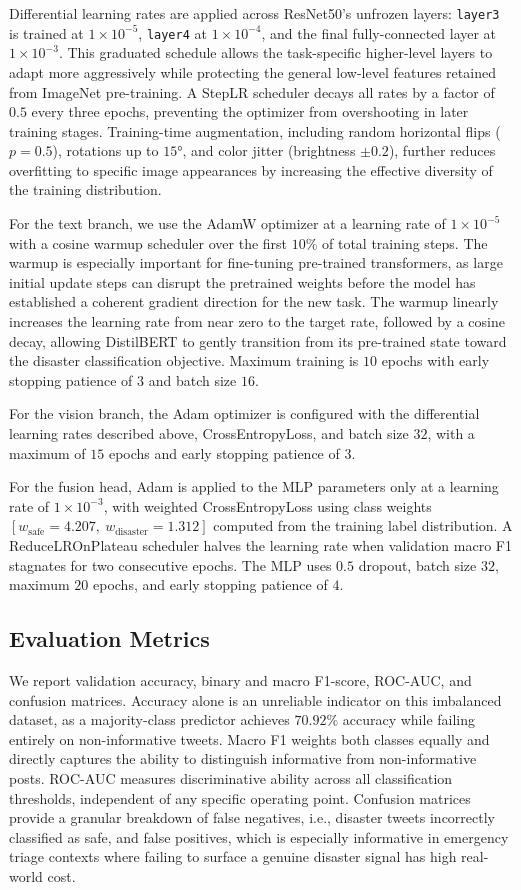 \documentclass[11pt,letterpaper]{article}
\begin{document}
Differential learning rates are applied across ResNet50's unfrozen layers: \texttt{layer3} is trained at $1\times10^{-5}$, \texttt{layer4} at $1\times10^{-4}$, and the final fully-connected layer at $1\times10^{-3}$. This graduated schedule allows the task-specific higher-level layers to adapt more aggressively while protecting the general low-level features retained from ImageNet pre-training. A StepLR scheduler decays all rates by a factor of $0.5$ every three epochs, preventing the optimizer from overshooting in later training stages. Training-time augmentation, including random horizontal flips ($p=0.5$), rotations up to $15°$, and color jitter (brightness $\pm0.2$), further reduces overfitting to specific image appearances by increasing the effective diversity of the training distribution.

For the text branch, we use the AdamW optimizer at a learning rate of $1\times10^{-5}$ with a cosine warmup scheduler over the first $10\%$ of total training steps. The warmup is especially important for fine-tuning pre-trained transformers, as large initial update steps can disrupt the pretrained weights before the model has established a coherent gradient direction for the new task. The warmup linearly increases the learning rate from near zero to the target rate, followed by a cosine decay, allowing DistilBERT to gently transition from its pre-trained state toward the disaster classification objective. Maximum training is $10$ epochs with early stopping patience of $3$ and batch size $16$.

For the vision branch, the Adam optimizer is configured with the differential learning rates described above, CrossEntropyLoss, and batch size $32$, with a maximum of $15$ epochs and early stopping patience of $3$.

For the fusion head, Adam is applied to the MLP parameters only at a learning rate of $1\times10^{-3}$, with weighted CrossEntropyLoss using class weights $[w_\text{safe}=4.207,\ w_\text{disaster}=1.312]$ computed from the training label distribution. A ReduceLROnPlateau scheduler halves the learning rate when validation macro F1 stagnates for two consecutive epochs. The MLP uses $0.5$ dropout, batch size $32$, maximum $20$ epochs, and early stopping patience of $4$.

\subsection{Evaluation Metrics}
We report validation accuracy, binary and macro F1-score, ROC-AUC, and confusion matrices. Accuracy alone is an unreliable indicator on this imbalanced dataset, as a majority-class predictor achieves $70.92\%$ accuracy while failing entirely on non-informative tweets. Macro F1 weights both classes equally and directly captures the ability to distinguish informative from non-informative posts. ROC-AUC measures discriminative ability across all classification thresholds, independent of any specific operating point. Confusion matrices provide a granular breakdown of false negatives, i.e., disaster tweets incorrectly classified as safe, and false positives, which is especially informative in emergency triage contexts where failing to surface a genuine disaster signal has high real-world cost.
\end{document}
